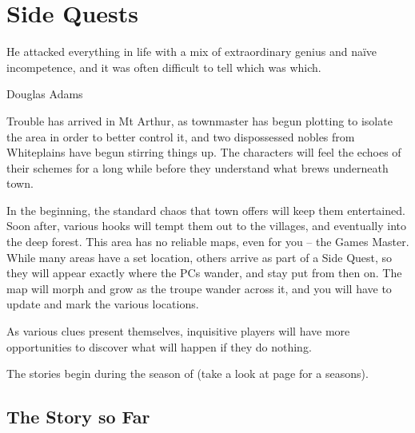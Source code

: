 \chapter{Side Quests}
  \epigraph{He attacked everything in life with a mix of extraordinary genius and na\"ive incompetence, and it was often difficult to tell which was which.}{Douglas Adams}

\begin{multicols}{2}

\noindent
Trouble has arrived in Mt Arthur, as \gls{townmaster} has begun plotting to isolate the area in order to better control it, and two dispossessed nobles from Whiteplains have begun stirring things up.
The characters will feel the echoes of their schemes for a long while before they understand what brews underneath \gls{town}.

In the beginning, the standard chaos that \gls{town} offers will keep them entertained.
Soon after, various hooks will tempt them out to the villages, and eventually into the deep forest.
This area has no reliable maps, even for you -- the Games Master.
While many areas have a set location, others arrive as part of a Side Quest, so they will appear exactly where the PCs wander, and stay put from then on.
The map will morph and grow as the troupe wander across it, and you will have to update and mark the various locations.

As various clues present themselves, inquisitive players will have more opportunities to discover what will happen if they do nothing.

The stories begin during the season of \season (take a look at page \pageref{astronomy} for a seasons).

\end{multicols}

\section{The Story so Far}

